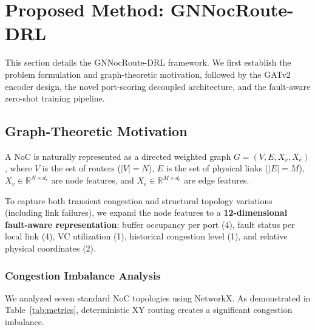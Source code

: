 \section{Proposed Method: GNNocRoute-DRL}
\label{sec:method}

This section details the GNNocRoute-DRL framework. We first establish the problem formulation and graph-theoretic motivation, followed by the GATv2 encoder design, the novel port-scoring decoupled architecture, and the fault-aware zero-shot training pipeline.

\subsection{Graph-Theoretic Motivation}
\label{sec:problem}

A NoC is naturally represented as a directed weighted graph $G = (V, E, X_v, X_e)$, where $V$ is the set of routers ($|V| = N$), $E$ is the set of physical links ($|E| = M$), $X_v \in \mathbb{R}^{N \times d_v}$ are node features, and $X_e \in \mathbb{R}^{M \times d_e}$ are edge features.

To capture both transient congestion and structural topology variations (including link failures), we expand the node features to a \textbf{12-dimensional fault-aware representation}: buffer occupancy per port (4), fault status per local link (4), VC utilization (1), historical congestion level (1), and relative physical coordinates (2).

\subsubsection{Congestion Imbalance Analysis}

We analyzed seven standard NoC topologies using NetworkX. As demonstrated in Table~\ref{tab:metrics}, deterministic XY routing creates a significant congestion imbalance.

\begin{table}[h]
\centering
\caption{Graph metrics across NoC topologies}
\label{tab:metrics}
\end{table}

